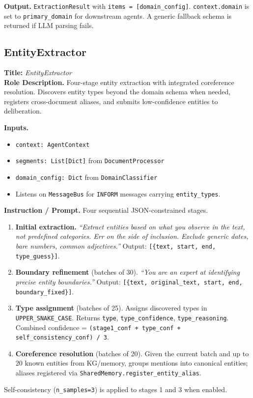 \documentclass{article}
\begin{document}
\begin{agentbox}
\textbf{Output.} \texttt{ExtractionResult} with \texttt{items = [domain\_config]}. \texttt{context.domain} is set to \texttt{primary\_domain} for downstream agents. A generic fallback schema is returned if LLM parsing fails.
\end{agentbox}

\newpage
\subsection{EntityExtractor}
\label{app:entity_extractor}

\begin{agentbox}
\textbf{Title:} \textit{EntityExtractor}\\
\textbf{Role Description.} Four-stage entity extraction with
integrated coreference resolution. Discovers entity types beyond the
domain schema when needed, registers cross-document aliases, and
submits low-confidence entities to deliberation.

\textbf{Inputs.}
\begin{itemize}[leftmargin=*,nosep]
\item \texttt{context: AgentContext}
\item \texttt{segments: List[Dict]} from \texttt{DocumentProcessor}
\item \texttt{domain\_config: Dict} from \texttt{DomainClassifier}
\item Listens on \texttt{MessageBus} for \texttt{INFORM} messages carrying \texttt{entity\_types}.
\end{itemize}

\textbf{Instruction / Prompt.} Four sequential JSON-constrained stages.
\begin{enumerate}[leftmargin=*,nosep]
\item \textbf{Initial extraction.} \textit{``Extract entities based on what you observe in the text, not predefined categories. Err on the side of inclusion. Exclude generic dates, bare numbers, common adjectives.''} Output: \texttt{[\{text, start, end, type\_guess\}]}.
\item \textbf{Boundary refinement} (batches of 30). \textit{``You are an expert at identifying precise entity boundaries.''} Output: \texttt{[\{text, original\_text, start, end, boundary\_fixed\}]}.
\item \textbf{Type assignment} (batches of 25). Assigns discovered types in \texttt{UPPER\_SNAKE\_CASE}. Returns \texttt{type}, \texttt{type\_confidence}, \texttt{type\_reasoning}. Combined confidence = \texttt{(stage1\_conf + type\_conf + self\_consistency\_conf) / 3}.
\item \textbf{Coreference resolution} (batches of 20). Given the current batch and up to 20 known entities from KG/memory, groups mentions into canonical entities; aliases registered via \texttt{SharedMemory.register\_entity\_alias}.
\end{enumerate}
Self-consistency (\texttt{n\_samples=3}) is applied to stages 1 and 3 when enabled.


\end{agentbox}
\end{document}
